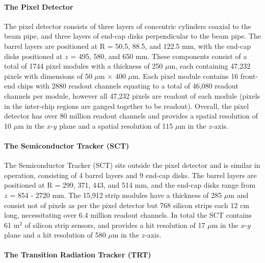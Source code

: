 \documentclass[12pt,a4paper,epsf,portrait,times,epsfig]{article}
\begin{document}
		\paragraph{The Pixel Detector}\label{Section:PixelDetector}

		The pixel detector consists of three layers of concentric cylinders coaxial to the beam pipe, and three layers of end-cap disks perpendicular to the beam pipe. The barrel layers are positioned at R = 50.5, 88.5, and 122.5 mm, with the end-cap disks positioned at $z$ = 495, 580, and 650 mm. These components consist of a total of 1744 pixel modules \cite{ATLASPixel} with a thickness of 250 $\mu$m, each containing 47,232 pixels with dimensions of 50 $\mu$m $\times$ 400 $\mu$m. Each pixel module contains 16 front-end chips with 2880 readout channels equating to a total of 46,080 readout channels per module, however all 47,232 pixels are readout of each module (pixels in the inter-chip regions are ganged together to be readout). Overall, the pixel detector has over 80 million readout channels and provides a spatial resolution of 10 $\mu$m in the $x$-$y$ plane and a spatial resolution of 115 $\mu$m in the $z$-axis. 


		\paragraph{The Semiconductor Tracker (SCT)}\label{Section:SCT}

		The Semiconductor Tracker (SCT) \cite{ATLASSCT} sits outside the pixel detector and is similar in operation, consisting of 4 barrel layers and 9 end-cap disks. The barrel layers are positioned at R = 299, 371, 443, and 514 mm, and the end-cap disks range from $z$ = 854 - 2720 mm. The 15,912 strip modules have a thickness of 285 $\mu$m and consist not of pixels as per the pixel detector but 768 silicon strips each 12 cm long, necessitating over 6.4 million readout channels. In total the SCT contains 61 m$^{2}$ of silicon strip sensors, and provides a hit resolution of 17 $\mu$m in the $x$-$y$ plane and a hit resolution of 580 $\mu$m in the $z$-axis. 

		\paragraph{The Transition Radiation Tracker (TRT)}\label{Section:TRT}
\end{document}

